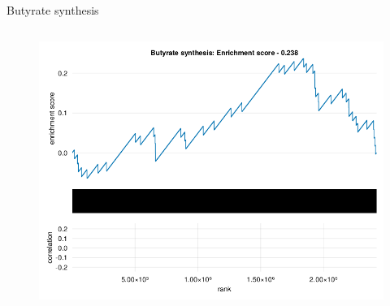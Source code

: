 \begin{frame}{Butyrate synthesis}
    \begin{columns}[c] %

        \begin{figure}
            \includegraphics[width=1\linewidth]{../figures/fsea_Butyrate-synthesis.png}
        \end{figure}

    \end{columns}

\end{frame}
